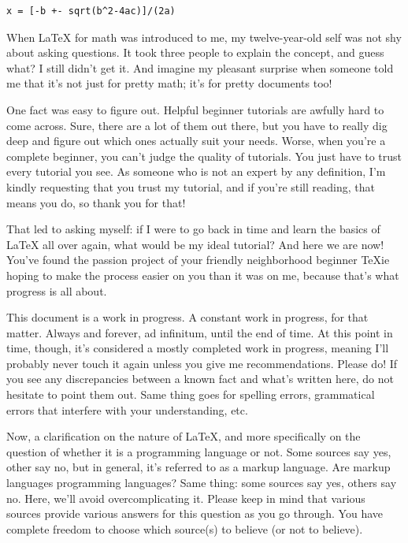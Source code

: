 \documentclass[letterpaper, 12pt]{article}
\begin{document}
\begin{verbatim}
x = [-b +- sqrt(b^2-4ac)]/(2a)
\end{verbatim}

When \LaTeX{} for math was introduced to me, my twelve-year-old self was not shy about asking questions. It took three people to explain the concept, and guess what? I still didn't get it. And imagine my pleasant surprise when someone told me that it's not just for pretty math; it's for pretty documents too!

One fact was easy to figure out. Helpful beginner tutorials are awfully hard to come across. Sure, there are a lot of them out there, but you have to really dig deep and figure out which ones actually suit your needs. Worse, when you're a complete beginner, you can't judge the quality of tutorials. You just have to trust every tutorial you see. As someone who is not an expert by any definition, I'm kindly requesting that you trust my tutorial, and if you're still reading, that means you do, so thank you for that!

That led to asking myself: if I were to go back in time and learn the basics of \LaTeX{} all over again, what would be my ideal tutorial? And here we are now! You've found the passion project of your friendly neighborhood beginner \TeX ie hoping to make the process easier on you than it was on me, because that's what progress is all about.

This document is a work in progress. A constant work in progress, for that matter. Always and forever, ad infinitum, until the end of time. At this point in time, though, it's considered a mostly completed work in progress, meaning I'll probably never touch it again unless you give me recommendations. Please do! If you see any discrepancies between a known fact and what's written here, do not hesitate to point them out. Same thing goes for spelling errors, grammatical errors that interfere with your understanding, etc.

Now, a clarification on the nature of \LaTeX, and more specifically on the question of whether it is a programming language or not. Some sources say yes, other say no, but in general, it's referred to as a markup language. Are markup languages programming languages? Same thing: some sources say yes, others say no. Here, we'll avoid overcomplicating it. Please keep in mind that various sources provide various answers for this question as you go through. You have complete freedom to choose which source(s) to believe (or not to believe).
\end{document}
